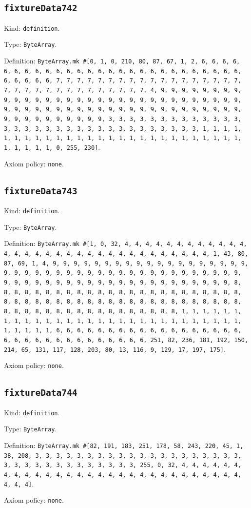 \documentclass[11pt]{article}
\begin{document}
\subsection*{\texttt{fixtureData742}}
\noindent Kind: \texttt{definition}.\par
\noindent Type: \texttt{ByteArray}.\par
\noindent Definition: \texttt{ByteArray.mk \#[0, 1, 0, 210, 80, 87, 67, 1, 2, 6, 6, 6, 6, 6, 6, 6, 6, 6, 6, 6, 6, 6, 6, 6, 6, 6, 6, 6, 6, 6, 6, 6, 6, 6, 6, 6, 6, 6, 6, 6, 6, 7, 7, 7, 7, 7, 7, 7, 7, 7, 7, 7, 7, 7, 7, 7, 7, 7, 7, 7, 7, 7, 7, 7, 7, 7, 7, 7, 7, 7, 7, 7, 7, 4, 9, 9, 9, 9, 9, 9, 9, 9, 9, 9, 9, 9, 9, 9, 9, 9, 9, 9, 9, 9, 9, 9, 9, 9, 9, 9, 9, 9, 9, 9, 9, 9, 9, 9, 9, 9, 9, 9, 9, 9, 9, 9, 9, 9, 9, 9, 9, 9, 9, 9, 9, 9, 9, 9, 9, 9, 9, 9, 9, 9, 9, 9, 9, 9, 3, 3, 3, 3, 3, 3, 3, 3, 3, 3, 3, 3, 3, 3, 3, 3, 3, 3, 3, 3, 3, 3, 3, 3, 3, 3, 3, 3, 3, 3, 3, 3, 1, 1, 1, 1, 1, 1, 1, 1, 1, 1, 1, 1, 1, 1, 1, 1, 1, 1, 1, 1, 1, 1, 1, 1, 1, 1, 1, 1, 1, 1, 1, 1, 0, 255, 230]}.\par
\noindent Axiom policy: \texttt{none}.\par
\subsection*{\texttt{fixtureData743}}
\noindent Kind: \texttt{definition}.\par
\noindent Type: \texttt{ByteArray}.\par
\noindent Definition: \texttt{ByteArray.mk \#[1, 0, 32, 4, 4, 4, 4, 4, 4, 4, 4, 4, 4, 4, 4, 4, 4, 4, 4, 4, 4, 4, 4, 4, 4, 4, 4, 4, 4, 4, 4, 4, 4, 4, 4, 1, 43, 80, 87, 69, 1, 4, 9, 9, 9, 9, 9, 9, 9, 9, 9, 9, 9, 9, 9, 9, 9, 9, 9, 9, 9, 9, 9, 9, 9, 9, 9, 9, 9, 9, 9, 9, 9, 9, 9, 9, 9, 9, 9, 9, 9, 9, 9, 9, 9, 9, 9, 9, 9, 9, 9, 9, 9, 9, 9, 9, 9, 9, 9, 9, 9, 9, 9, 9, 9, 9, 8, 8, 8, 8, 8, 8, 8, 8, 8, 8, 8, 8, 8, 8, 8, 8, 8, 8, 8, 8, 8, 8, 8, 8, 8, 8, 8, 8, 8, 8, 8, 8, 8, 8, 8, 8, 8, 8, 8, 8, 8, 8, 8, 8, 8, 8, 8, 8, 8, 8, 8, 8, 8, 8, 8, 8, 8, 8, 8, 8, 8, 8, 8, 8, 1, 1, 1, 1, 1, 1, 1, 1, 1, 1, 1, 1, 1, 1, 1, 1, 1, 1, 1, 1, 1, 1, 1, 1, 1, 1, 1, 1, 1, 1, 1, 1, 1, 1, 6, 6, 6, 6, 6, 6, 6, 6, 6, 6, 6, 6, 6, 6, 6, 6, 6, 6, 6, 6, 6, 6, 6, 6, 6, 6, 6, 6, 6, 6, 6, 6, 251, 82, 236, 181, 192, 150, 214, 65, 131, 117, 128, 203, 80, 13, 116, 9, 129, 17, 197, 175]}.\par
\noindent Axiom policy: \texttt{none}.\par
\subsection*{\texttt{fixtureData744}}
\noindent Kind: \texttt{definition}.\par
\noindent Type: \texttt{ByteArray}.\par
\noindent Definition: \texttt{ByteArray.mk \#[82, 191, 183, 251, 178, 58, 243, 220, 45, 1, 38, 208, 3, 3, 3, 3, 3, 3, 3, 3, 3, 3, 3, 3, 3, 3, 3, 3, 3, 3, 3, 3, 3, 3, 3, 3, 3, 3, 3, 3, 3, 3, 3, 3, 3, 255, 0, 32, 4, 4, 4, 4, 4, 4, 4, 4, 4, 4, 4, 4, 4, 4, 4, 4, 4, 4, 4, 4, 4, 4, 4, 4, 4, 4, 4, 4, 4, 4, 4, 4]}.\par
\noindent Axiom policy: \texttt{none}.\par
\end{document}
